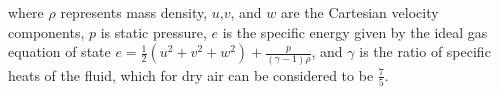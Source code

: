 where $\rho$ represents mass density, $u$,$v$, and $w$ are the Cartesian velocity components, $p$ is static pressure, $e$ is the specific energy given by the ideal gas equation of state 
$e = \frac{1}{2}\left( {{u^2} + {v^2} + {w^2}} \right) + \frac{p}{{\left( {\gamma  - 1} \right)\rho }}$,
and $\gamma$ is the ratio of specific heats of the fluid, which for dry air can be considered to be $\frac{7}{5}$.


